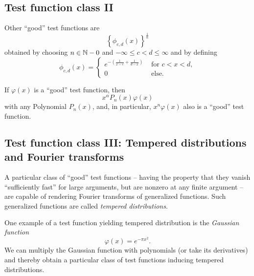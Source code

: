 \subsection{Test function class II}

Other ``good'' test functions are \cite{schwartz}
\begin{equation}
\left\{\phi_{c,d}(x)\right\}^\frac{1}{n}
\end{equation}
obtained by choosing $n\in {\Bbb N} - 0$
and $-\infty \le c<d\le \infty$ and by defining
\begin{equation}
\phi_{c,d}(x)
=
\begin{cases}
e^{-\left( \frac{1}{x-c} + \frac{1}{d-x} \right)} & \textrm{ for }  c<x<d ,   \\
                                                0 & \textrm{ else.}
\end{cases}
\end{equation}

If $\varphi (x)$ is a ``good'' test function, then
\begin{equation}
x^\alpha P_n (x)\varphi (x)
\end{equation}
with any Polynomial $P_n (x)$, and, in particular, $x^n\varphi (x)  $ also is
 a ``good'' test function.

\subsection{Test function class III: Tempered distributions and Fourier transforms}

A particular class of ``good'' test functions -- having the property that they vanish
``sufficiently fast'' for large arguments, but are nonzero at any finite argument --
are capable of rendering Fourier transforms of generalized functions. Such generalized functions are called
{\em tempered distributions}.

One example of a test function yielding tempered distribution is the {\em Gaussian function}
\begin{equation}
\varphi (x)= e^{-\pi x^2}.
\label{2012-m-ch-di-td}
\end{equation}
We can multiply the Gaussian function with polynomials (or take its derivatives) and thereby obtain a particular class of test functions
inducing tempered distributions.



